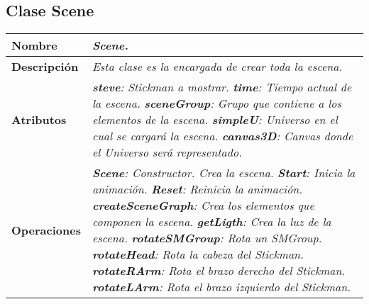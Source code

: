       \subsection{Clase Scene}
         \begin{table}[!ht] 
            \centering
            \begin{tabular}{|p{4cm}|p{11.5cm}|}
            \hline
            \textbf{Nombre} & \textit{Scene.}\\ \hline
            \textbf{Descripción} & \textit{Esta clase es la encargada de crear toda la escena.}\\ \hline
            \textbf{Atributos} & \textit{\textbf{steve}: Stickman a mostrar.}\newline
                                 \textit{\textbf{time}: Tiempo actual de la escena.}\newline
                                 \textit{\textbf{sceneGroup}: Grupo que contiene a los elementos de la escena.}\newline
                                 \textit{\textbf{simpleU}: Universo en el cual se cargará la escena.}\newline
                                 \textit{\textbf{canvas3D}: Canvas donde el Universo será representado.}\\ \hline
            \textbf{Operaciones} & \textit{\textbf{Scene}: Constructor. Crea la escena.}\newline
                                    \textit{\textbf{Start}: Inicia la animación.}\newline
                                    \textit{\textbf{Reset}: Reinicia la animación.}\newline
                                    \textit{\textbf{createSceneGraph}: Crea los elementos que componen la escena.}\newline
                                    \textit{\textbf{getLigth}: Crea la luz de la escena.}\newline
                                    \textit{\textbf{rotateSMGroup}: Rota un SMGroup.}\newline
                                    \textit{\textbf{rotateHead}: Rota la cabeza del Stickman.}\newline
                                    \textit{\textbf{rotateRArm}: Rota el brazo derecho del Stickman.}\newline
                                    \textit{\textbf{rotateLArm}: Rota el brazo izquierdo del Stickman.}\newline

\end{tabular}
\end{table}
